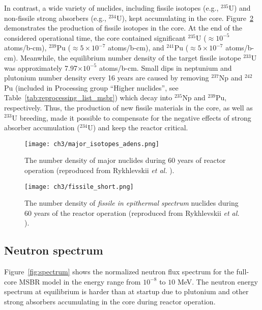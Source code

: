 In contrast, a wide variety of nuclides, including fissile isotopes (e.g.,  
$^{235}$U) and non-fissile strong absorbers (e.g., $^{234}$U), kept 
accumulating in the core. Figure~\ref{fig:fissile_short} demonstrates the 
production of fissile isotopes in the core. At the end of the considered 
operational time, the core contained significant $^{235}$U ($\approx10^{-5}$ 
atoms/b-cm), $^{239}$Pu ($\approx5\times10^{-7}$ atoms/b-cm), and $^{241}$Pu 
($\approx 5\times10^{-7}$ atoms/b-cm). Meanwhile, the equilibrium number 
density of the target fissile isotope $^{233}$U was approximately 
7.97$\times10^{-5}$ atoms/b-cm. Small dips in neptunium and plutonium number 
density every 16 years are caused by removing $^{237}$Np and $^{242}$Pu 
(included in Processing group ``Higher nuclides'', see 
Table~\ref{tab:reprocessing_list_msbr}) which decay into $^{235}$Np and 
$^{239}$Pu, respectively. Thus, the production of new fissile materials in the 
core, as well as $^{233}$U breeding, made it possible to compensate for the 
negative effects of strong absorber accumulation ($^{234}$U) and keep the 
reactor critical.
\begin{figure}[ht!] %
	\centering
	\texttt{[image: ch3/major\_isotopes\_adens.png]}
	\caption{The number density of major nuclides during 60 years of reactor 
		operation (reproduced from Rykhlevskii \emph{et al.}  
		\cite{rykhlevskii_modeling_2019}).}
	\label{fig:adens_eq}
\end{figure}
\begin{figure}[t] %
	\centering
	\texttt{[image: ch3/fissile\_short.png]}
	\vspace{-6mm}
	\caption{The number density of \emph{fissile in epithermal spectrum} 
	nuclides during 60 years of the reactor operation (reproduced from 
		Rykhlevskii \emph{et al.} \cite{rykhlevskii_modeling_2019}).}
	\label{fig:fissile_short}
\end{figure}
\FloatBarrier

\subsection{Neutron spectrum}
Figure~\ref{fig:spectrum} shows the normalized neutron flux spectrum for the 
full-core \gls{MSBR} model in the energy range from $10^{-8}$ to $10$ MeV. The 
neutron energy spectrum at equilibrium is harder than at startup due to 
plutonium and other strong absorbers accumulating in the core during reactor 
operation.  

